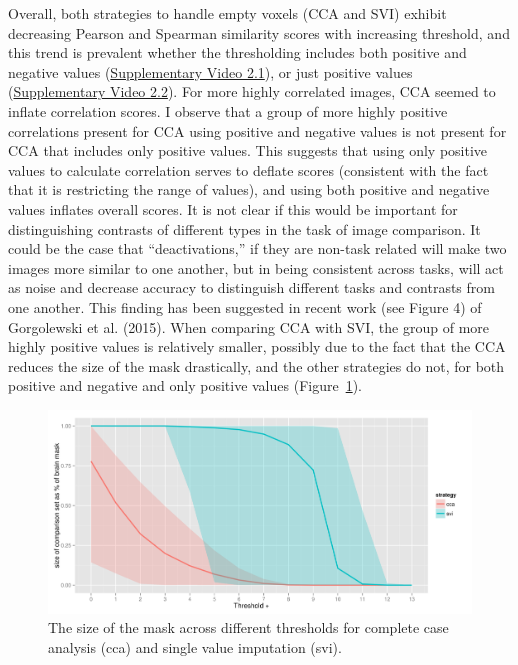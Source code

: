 \documentclass{report}
\begin{document}
Overall, both strategies to handle empty voxels (CCA and SVI) exhibit
decreasing Pearson and Spearman similarity scores with increasing
threshold, and this trend is prevalent whether the thresholding includes
both positive and negative values (\href{https://github.com/vsoch/thesis/blob/master/supplementary/chapter2/supp_figure1A.avi}{Supplementary Video 2.1}), or just
positive values (\href{https://github.com/vsoch/thesis/blob/master/supplementary/chapter2/supp_figure1B.avi}{Supplementary Video 2.2}). For more highly correlated
images, CCA seemed to inflate correlation scores. I observe that a group
of more highly positive correlations present for CCA using positive and
negative values is not present for CCA that includes only positive
values. This suggests that using only positive values to calculate
correlation serves to deflate scores (consistent with the fact that it
is restricting the range of values), and using both positive and
negative values inflates overall scores. It is not clear if this would
be important for distinguishing contrasts of different types in the task
of image comparison. It could be the case that ``deactivations,'' if
they are non-task related will make two images more similar to one
another, but in being consistent across tasks, will act as noise and
decrease accuracy to distinguish different tasks and contrasts from one
another. This finding has been suggested in recent work (see Figure 4)
of Gorgolewski et al. (2015). When comparing CCA with SVI, the group of
more highly positive values is relatively smaller, possibly due to the
fact that the CCA reduces the size of the mask drastically, and the
other strategies do not, for both positive and negative and
only positive values (Figure~\ref{fig:22}).

\begin{figure}[h!]
\begin{center}
\includegraphics[width=15cm]{images/figure22.png}
\end{center}
\caption{\label{fig:22} The size of the mask across different thresholds for complete case analysis (cca) and single value imputation (svi).}
\end{figure}
\end{document}
